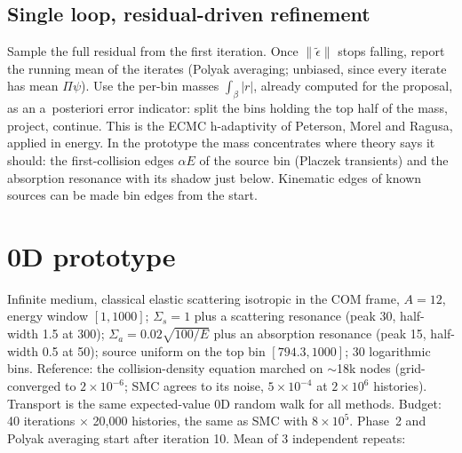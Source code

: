 \documentclass[11pt]{article}
\newcommand{\teps}{\tilde\epsilon}
\begin{document}
\subsection{Single loop, residual-driven refinement}
Sample the full residual from the first iteration. Once $\|\teps\|$ stops falling, report
the running mean of the iterates (Polyak averaging; unbiased, since every iterate has
mean $\Pi\psi$). Use the per-bin masses $\int_\beta|r|$, already computed for the
proposal, as an a~posteriori error indicator: split the bins holding the top half of the
mass, project, continue. This is the ECMC h-adaptivity of Peterson, Morel and Ragusa,
applied in energy. In the prototype the mass concentrates where theory says it should:
the first-collision edges $\alpha E$ of the source bin (Placzek transients) and the
absorption resonance with its shadow just below. Kinematic edges of known sources can be
made bin edges from the start.

\section{0D prototype}\label{sec:proto}

Infinite medium, classical elastic scattering isotropic in the COM frame, $A=12$, energy
window $[1,1000]$; $\Sigma_s=1$ plus a scattering resonance (peak 30, half-width 1.5 at
300); $\Sigma_a=0.02\sqrt{100/E}$ plus an absorption resonance (peak 15, half-width 0.5 at
50); source uniform on the top bin $[794.3,1000]$; 30 logarithmic bins. Reference: the
collision-density equation marched on $\sim$18k nodes (grid-converged to $2\times10^{-6}$;
SMC agrees to its noise, $5\times10^{-4}$ at $2\times10^6$ histories). Transport is the
same expected-value 0D random walk for all methods. Budget: 40 iterations $\times$ 20{,}000
histories, the same as SMC with $8\times10^5$. Phase~2 and Polyak averaging start after
iteration 10. Mean of 3 independent repeats:
\end{document}
